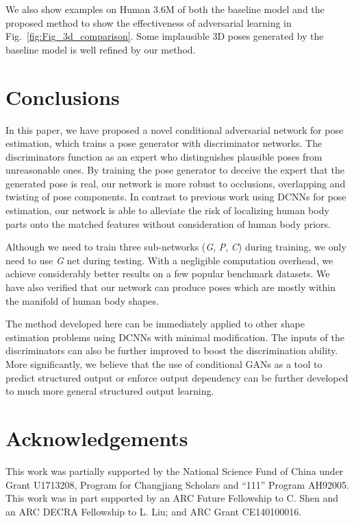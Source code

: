 \documentclass[10pt,journal,compsoc]{IEEEtran}
\begin{document}
We also show examples on Human 3.6M of both the baseline model and the proposed method to show the effectiveness of adversarial learning in Fig.~\ref{fig:Fig_3d_comparison}.
Some implausible 3D poses generated by the baseline model is well refined by our method.




\section{Conclusions}

In this paper, we have proposed a novel conditional adversarial network for pose estimation, which trains a pose generator with discriminator networks. The discriminators function as an expert who distinguishes plausible poses from unreasonable ones. By training the pose generator to deceive the expert that the generated pose is real, our network is more robust to occlusions, overlapping and twisting of pose components. In contrast to previous work using DCNNs for  pose estimation, our network is able to alleviate  the risk of localizing   human body parts onto the  matched features  without consideration of human body priors.

Although we need to train three sub-networks (\textit{G}, \textit{P}, \textit{C}) during training,
we only need to use \textit{G} net during testing. With a negligible  computation overhead, we achieve considerably better results on a few popular benchmark datasets.
We have also verified that our network can produce poses which are mostly within the manifold of human body shapes.

The method developed here can be immediately applied to other shape estimation problems using DCNNs with minimal modification.
The inputs of the discriminators can also be further improved to boost the discrimination ability.
More significantly, we believe that the use of conditional GANs as a tool to predict structured  output  or enforce
output dependency can be further developed to much more general structured output learning.









\section*{Acknowledgements}



This work was partially supported by the National Science Fund of China under Grant  U1713208, Program for Changjiang Scholars
and “111” Program AH92005.
This work was in part supported by an ARC Future Fellowship to C. Shen and an ARC DECRA Fellowship to L. Liu;
and ARC Grant CE140100016.












%
%
%
%
%
%

%
%
%
%
%
%


%



%
%
\ifCLASSOPTIONcaptionsoff
  \newpage
\fi









%
\end{document}

